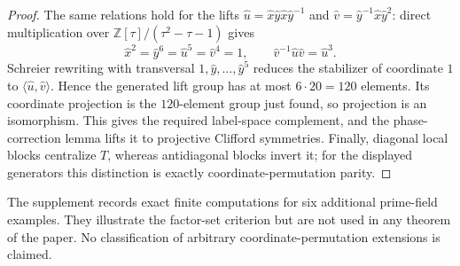 \begin{proof}
The same relations hold for the lifts
\(\widehat u=\widehat x\widehat y\widehat x\widehat y^{-1}\) and
\(\widehat v=\widehat y^{-1}\widehat x\widehat y^2\): direct multiplication
over \(\mathbb Z[\tau]/(\tau^2-\tau-1)\) gives
\[
 \widehat x^2=\widehat y^6=\widehat u^5=\widehat v^4=1,
 \qquad \widehat v^{-1}\widehat u\widehat v=\widehat u^3.
\]
Schreier rewriting with transversal
\(1,\widehat y,\ldots,\widehat y^5\) reduces the stabilizer of coordinate
\(1\) to \(\langle\widehat u,\widehat v\rangle\).  Hence the generated lift
group has at most \(6\cdot20=120\) elements.  Its coordinate projection is
the \(120\)-element group just found, so projection is an isomorphism.  This
gives the required label-space complement, and the phase-correction lemma
lifts it to projective Clifford symmetries.  Finally, diagonal local blocks
centralize \(T\), whereas antidiagonal blocks invert it; for the displayed
generators this distinction is exactly coordinate-permutation parity.
\end{proof}

The supplement records exact finite computations for six additional
prime-field examples.  They illustrate the factor-set criterion but are not
used in any theorem of the paper.  No classification of arbitrary
coordinate-permutation extensions is claimed.
